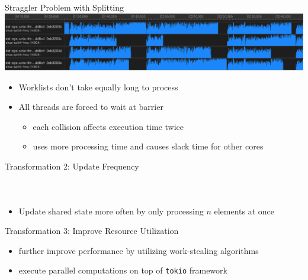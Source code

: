 \documentclass[aspectratio=169, usenames, dvipsnames]{beamer}
\begin{document}
\begin{frame}{Straggler Problem with Splitting}
  \includegraphics[width=\textwidth,keepaspectratio]{img/cpu_load_split.png}
  
  \vfill
  \begin{itemize}
    \item<2-> Worklists don't take equally long to process
    \item<3-> All threads are forced to wait at barrier
    \begin{itemize}
      \item<3-> each collision affects execution time twice
      \item<4-> uses more processing time and causes slack time for other cores
    \end{itemize}
  \end{itemize}
\end{frame}

\begin{frame}{Transformation 2: Update Frequency}
  \begin{columns}
    \begin{column}{.5\textwidth}
      \inputminted[bgcolor=rustcolor, fontsize=\tiny]{rust}{code/split.rs}
    \end{column}
    \begin{column}{.5\textwidth}
    \end{column}
  \end{columns}%
  \begin{itemize}
    \item<2-> Update shared state more often by only processing $n$ elements at once
  \end{itemize}
  \vfill
\end{frame}

\begin{frame}{Transformation 3: Improve Resource Utilization}
  \begin{itemize}
    \item further improve performance by utilizing work-stealing algorithms
    \item execute parallel computations on top of \texttt{tokio} framework
  \end{itemize}
\end{frame}
\end{document}
